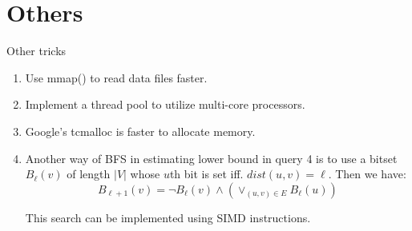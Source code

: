 
\section{Others}
\begin{frame}{Other tricks}
  \begin{enumerate}

    \item Use mmap() to read data files faster.

    \item Implement a thread pool to utilize multi-core processors.

    \item Google's tcmalloc is faster to allocate memory.

    \item

      Another way of BFS in estimating lower bound in query 4
      is to use a bitset $ B_{\ell}(v)$ of length $ |V|$ whose $ u$th bit
      is set iff. $ dist(u, v) =\ell$. Then we have:
      \[ B_{\ell+1}(v)  = \neg B_{\ell}(v) \wedge (\vee_{(u, v) \in E}B_{\ell}(u))\]

      This search can be implemented using SIMD instructions.
  \end{enumerate}
\end{frame}

